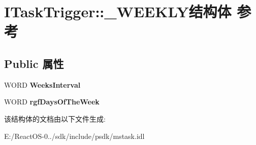 \hypertarget{struct_i_task_trigger_1_1___w_e_e_k_l_y}{}\section{I\+Task\+Trigger\+:\+:\+\_\+\+W\+E\+E\+K\+L\+Y结构体 参考}
\label{struct_i_task_trigger_1_1___w_e_e_k_l_y}
\subsection*{Public 属性}
\begin{DoxyCompactItemize}
\item 
\mbox{\label{struct_i_task_trigger_1_1___w_e_e_k_l_y_a0ad52942e6db3db0003067813911e443}} 
W\+O\+RD {\bfseries Weeks\+Interval}
\item 
\mbox{\label{struct_i_task_trigger_1_1___w_e_e_k_l_y_ad6af7b8c725b265514a639c2ff588050}} 
W\+O\+RD {\bfseries rgf\+Days\+Of\+The\+Week}
\end{DoxyCompactItemize}


该结构体的文档由以下文件生成\+:\begin{DoxyCompactItemize}
\item 
E\+:/\+React\+O\+S-\/0../sdk/include/psdk/mstask.\+idl\end{DoxyCompactItemize}

